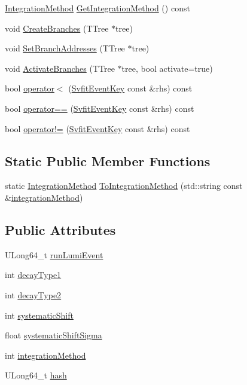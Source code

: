 \begin{DoxyCompactItemize}
\item 
\hyperlink{classSvfitEventKey_a88a764b33d83be8b5ac538a980de7b03}{IntegrationMethod} \hyperlink{classSvfitEventKey_ac7d1b2868f3d0e24b61af7406e085c04}{GetIntegrationMethod} () const 
\item 
void \hyperlink{classSvfitEventKey_a29b6a06e4503052c4460277b9a97168d}{CreateBranches} (TTree $\ast$tree)
\item 
void \hyperlink{classSvfitEventKey_a14b4be71d2b92bdc1e2439bf088edfee}{SetBranchAddresses} (TTree $\ast$tree)
\item 
void \hyperlink{classSvfitEventKey_aa6ef8de6f65a785ae34fdb7ffd8aa5b3}{ActivateBranches} (TTree $\ast$tree, bool activate=true)
\item 
bool \hyperlink{classSvfitEventKey_aa21176141d7621a159c9e13443058385}{operator$<$} (\hyperlink{classSvfitEventKey}{SvfitEventKey} const \&rhs) const 
\item 
bool \hyperlink{classSvfitEventKey_a4acd29df38157399bb5879ebf430e111}{operator==} (\hyperlink{classSvfitEventKey}{SvfitEventKey} const \&rhs) const 
\item 
bool \hyperlink{classSvfitEventKey_a16bde69686be01e07c60db6fe5fc2df0}{operator!=} (\hyperlink{classSvfitEventKey}{SvfitEventKey} const \&rhs) const 
\end{DoxyCompactItemize}
\subsection*{Static Public Member Functions}
\begin{DoxyCompactItemize}
\item 
static \hyperlink{classSvfitEventKey_a88a764b33d83be8b5ac538a980de7b03}{IntegrationMethod} \hyperlink{classSvfitEventKey_ab29dafe105b8ade3257ee81cc31ad7ef}{ToIntegrationMethod} (std::string const \&\hyperlink{classSvfitEventKey_a8e070522e0476b25b155fb94d4a53e56}{integrationMethod})
\end{DoxyCompactItemize}
\subsection*{Public Attributes}
\begin{DoxyCompactItemize}
\item 
ULong64\_\-t \hyperlink{classSvfitEventKey_afaa8e9d1f49d1717f6498c17a5b6a37a}{runLumiEvent}
\item 
int \hyperlink{classSvfitEventKey_a6d4378d317fc0e19a7ce7428c4524343}{decayType1}
\item 
int \hyperlink{classSvfitEventKey_a2a985c09ffce1e4e79cfa375c29f6ee0}{decayType2}
\item 
int \hyperlink{classSvfitEventKey_aadc4624e556a70b6c095ac5373f8bbc8}{systematicShift}
\item 
float \hyperlink{classSvfitEventKey_a1e9c9f821950ae0d027d21a8ebd67f46}{systematicShiftSigma}
\item 
int \hyperlink{classSvfitEventKey_a8e070522e0476b25b155fb94d4a53e56}{integrationMethod}
\item 
ULong64\_\-t \hyperlink{classSvfitEventKey_a4a66e2828f6714fb510373c0df2fd3b6}{hash}
\end{DoxyCompactItemize}


